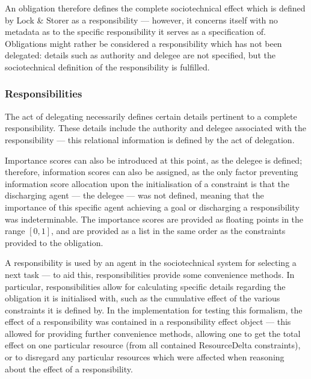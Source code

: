 An obligation therefore defines the complete sociotechnical effect which is defined by Lock \& Storer as a responsibility --- however, it concerns itself with no metadata as to the specific responsibility it serves as a specification of. Obligations might rather be considered a responsibility which has not been delegated: details such as authority and delegee are not specified, but the sociotechnical definition of the responsibility is fulfilled.\par

\subsubsection{Responsibilities}  %
The act of delegating necessarily defines certain details pertinent to a complete responsibility. These details include the authority and delegee associated with the responsibility --- this relational information is defined by the act of delegation.\par

Importance scores can also be introduced at this point, as the delegee is defined; therefore, information scores can also be assigned, as the only factor preventing information score allocation upon the initialisation of a constraint is that the discharging agent --- the delegee --- was not defined, meaning that the importance of this specific agent achieving a goal or discharging a responsibility was indeterminable. The importance scores are provided as floating points in the range \([0,1]\), and are provided as a list in the same order as the constraints provided to the obligation.\par

A responsibility is used by an agent in the sociotechnical system for selecting a next task --- to aid this, responsibilities provide some convenience methods. In particular, responsibilities allow for calculating specific details regarding the obligation it is initialised with, such as the cumulative effect of the various constraints it is defined by. In the implementation for testing this formalism, the effect of a responsibility was contained in a responsibility effect object --- this allowed for providing further convenience methods, allowing one to get the total effect on one particular resource (from all contained ResourceDelta constraints), or to disregard any particular resources which were affected when reasoning about the effect of a responsibility.\par


